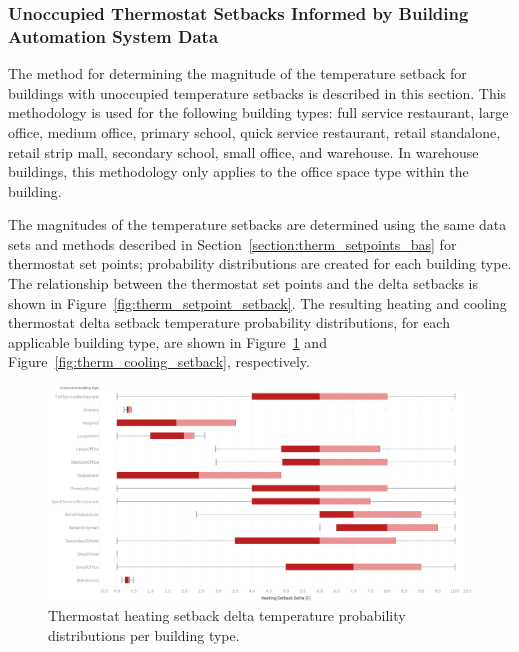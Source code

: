 \medskip


\subsubsection{Unoccupied Thermostat Setbacks Informed by Building Automation System Data}

The method for determining the magnitude of the temperature setback for buildings with unoccupied temperature setbacks is described in this section. This methodology is used for the following building types: full service restaurant, large office, medium office, primary school, quick service restaurant, retail standalone, retail strip mall, secondary school, small office, and warehouse. In warehouse buildings, this methodology only applies to the office space type within the building.

The magnitudes of the temperature setbacks are determined using the same data sets and methods described in Section~\ref{section:therm_setpoints_bas} for thermostat set points; probability distributions are created for each building type. The relationship between the thermostat set points and the delta setbacks is shown in Figure~\ref{fig:therm_setpoint_setback}. The resulting heating and cooling thermostat delta setback temperature probability distributions, for each applicable building type, are shown in Figure~\ref{fig:therm_heating_setback} and Figure~\ref{fig:therm_cooling_setback}, respectively.

\begin{figure}
    \centering \includegraphics[width=1.0\textwidth]{figures/heating_setbacks.png}
    \caption{Thermostat heating setback delta temperature probability distributions per building type.}
    \label{fig:therm_heating_setback}
\end{figure}

